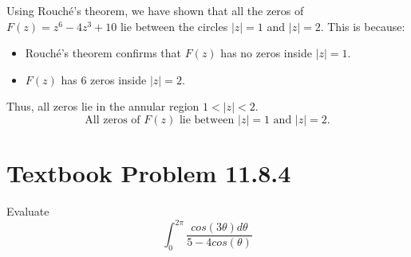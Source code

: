 \documentclass[12pt]{article}
\begin{document}
        Using Rouché's theorem, we have shown that all the zeros of \(F(z) = z^6 - 4z^3 + 10\) lie between the circles \(|z| = 1\) and \(|z| = 2\). This is because:
        \begin{itemize}
            \item Rouché's theorem confirms that \(F(z)\) has no zeros inside \(|z| = 1\).
            \item \(F(z)\) has 6 zeros inside \(|z| = 2\).
        \end{itemize}
        Thus, all zeros lie in the annular region \(1 < |z| < 2\).
        \[
        \boxed{\text{All zeros of \(F(z)\) lie between \(|z| = 1\) and \(|z| = 2\).}}
        \]

\section*{Textbook Problem 11.8.4}
    Evaluate 
    \[
        \int_0^{2\pi} \frac{cos(3 \theta) d\theta}{5 - 4 cos(\theta)}
    \]
\end{document}
